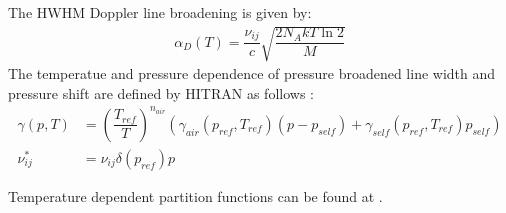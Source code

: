 The HWHM Doppler line broadening is given by: 
\begin{align*}
	\alpha_D(T) = \dfrac{\nu_{ij}}{c} \sqrt{\dfrac{2 N_A k T \ln 2}{M}}
\end{align*}
The temperatue and pressure dependence of pressure broadened line width and pressure shift are defined by HITRAN as follows \cite{hitran2}: 
\begin{align*}
	\gamma(p, T) &= \left(\dfrac{T_{ref}}{T}\right)^{n_{air}}  
	               \left(  \gamma_{air} (p_{ref}, T_{ref}) (p - p_{self}) +
	                       \gamma_{self}(p_{ref}, T_{ref}) p_{self}  \right) 		 \\
	\nu_{ij}^*   &= \nu_{ij} \delta(p_{ref}) p
\end{align*}

Temperature dependent partition functions can be found at \cite{hitran3}.